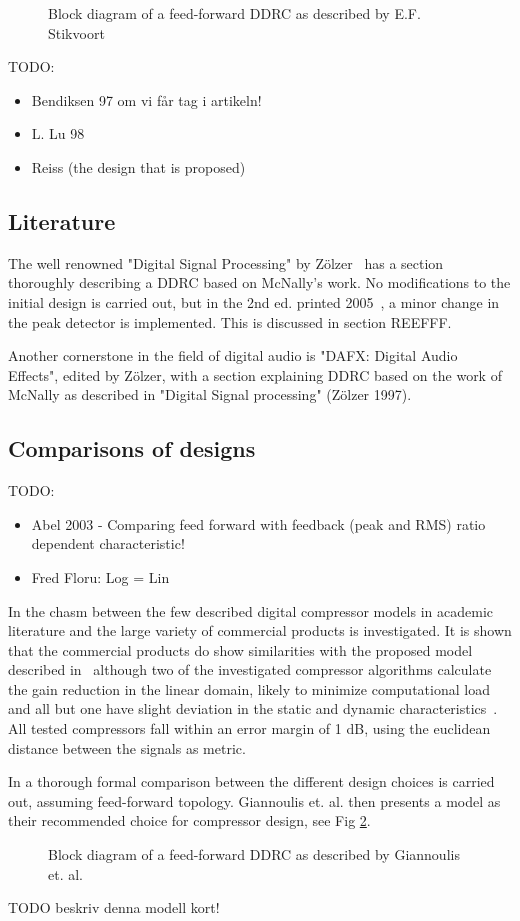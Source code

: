 \documentclass[../main2.tex]{subfiles}
\begin{document}
\begin{figure}
\caption{Block diagram of a feed-forward DDRC as described by E.F. Stikvoort}
\label{fig:block_stikvoort}
\end{figure}

TODO:
\begin{itemize}
\item Bendiksen 97 om vi får tag i artikeln!
\item L. Lu 98
\item Reiss (the design that is proposed)
\end{itemize}

\subsection*{Literature}
The well renowned  "Digital Signal Processing" by Zölzer~\cite{zoe1997digital} has a section thoroughly describing a DDRC based on McNally's work. No modifications to the initial design is carried out, but in the 2nd ed. printed 2005~\cite{zoelzer2005digital}, a minor change in the peak detector is implemented. This is discussed in section REEFFF.

Another cornerstone  in the field of digital audio is "DAFX: Digital Audio Effects", edited by Zölzer, with a section explaining DDRC based on the work of McNally as described in "Digital Signal processing" (Zölzer 1997).

\subsection{Comparisons of designs}
TODO:
\begin{itemize}
\item Abel 2003 - Comparing feed forward with feedback (peak and RMS) ratio dependent characteristic!
\item Fred Floru: Log = Lin
\end{itemize}

In \cite{bitzer2006parameter} the chasm between the few described digital compressor models in academic literature and the large variety of commercial products is investigated. It is shown that the commercial products do show similarities with the proposed model described in~\cite{mcnally1984dynamic}\cite{zolzer1997digital}\cite{dafx} although two of the investigated compressor algorithms calculate the gain reduction in the linear domain, likely to minimize computational load and all but one have slight deviation in the static and dynamic characteristics~\cite{bitzer2006parameter}. All tested compressors fall within an error margin of 1 dB, using the euclidean distance between the signals as metric.

In \cite{reiss2012tutorial} a thorough formal comparison between the different design choices is carried out, assuming feed-forward topology. Giannoulis et. al.  then presents a model as their recommended choice for compressor design, see Fig \ref{fig:gian_ddrc_block}.
\begin{figure}
\caption{Block diagram of a feed-forward DDRC as described by Giannoulis et. al.}
\label{fig:gian_ddrc_block}
\end{figure}

TODO beskriv denna modell kort!
\end{document}
